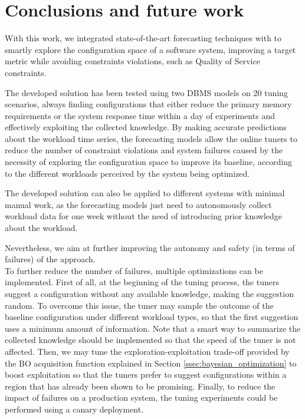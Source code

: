 \documentclass[a4paper, 12pt]{article} %
\begin{document}
	\clearpage
	\section{Conclusions and future work}
	With this work, we integrated state-of-the-art forecasting techniques with \cite{AkamasCGP} to smartly explore the configuration space of a software system, improving a target metric while avoiding constraints violations, such as Quality of Service constraints. 
	
	The developed solution has been tested using two DBMS models on 20 tuning scenarios, always finding configurations that either reduce the primary memory requirements or the system response time within a day of experiments and effectively exploiting the collected knowledge. By making accurate predictions about the workload time series, the forecasting models allow the online tuners to reduce the number of constraint violations and system failures caused by the necessity of exploring the configuration space to improve its baseline, according to the different workloads perceived by the system being optimized. 
	
	The developed solution can also be applied to different systems with minimal manual work, as the forecasting models just need to autonomously collect workload data for one week without the need of introducing prior knowledge about the workload.
	
	Nevertheless, we aim at further improving the autonomy and safety (in terms of failures) of the approach. \\	
	To further reduce the number of failures, multiple optimizations can be implemented. First of all, at the beginning of the tuning process, the tuners suggest a configuration without any available knowledge, making the suggestion random. To overcome this issue, the tuner may sample the outcome of the baseline configuration under different workload types, so that the first suggestion uses a minimum amount of information. Note that a smart way to summarize the collected knowledge should be implemented so that the speed of the tuner is not affected. Then, we may tune the exploration-exploitation trade-off provided by the BO acquisition function explained in Section \ref{ssec:bayesian_optimization} to boost exploitation so that the tuners prefer to suggest configurations within a region that has already been shown to be promising. Finally, to reduce the impact of failures on a production system, the tuning experiments could be performed using a canary deployment.
	
\end{document}

